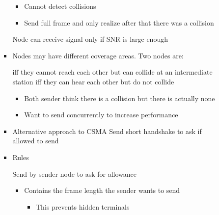 \begin{itemize}
\begin{itemize}
\begin{itemize}
\begin{itemize}
                            \item Cannot detect collisions
                            \item Send full frame and only realize after that there was a collision
                        \end{itemize}
                     Node can receive signal only if SNR is large enough
                    \item Nodes may have different coverage areas. Two nodes are:
                        \begin{itemize}
                             iff they cannot reach each other but can collide at an intermediate station
                             iff they can hear each other but do not collide
                                \begin{itemize}
                                    \item Both sender think there is a collision but there is actually none
                                    \item Want to send concurrently to increase performance
                                \end{itemize}
                        \end{itemize}
                \end{itemize}
                \begin{itemize}
                    \item Alternative approach to CSMA
                     Send short handshake to ask if allowed to send
                    \item Rules
                        \begin{itemize}
                             Send by sender node to ask for allowance
                                \begin{itemize}
                                    \item Contains the frame length the sender wants to send
                                        \begin{itemize}
                                            \item This prevents hidden terminals
                                        \end{itemize}
                                \end{itemize}

\end{itemize}
\end{itemize}
\end{itemize}
\end{itemize}
